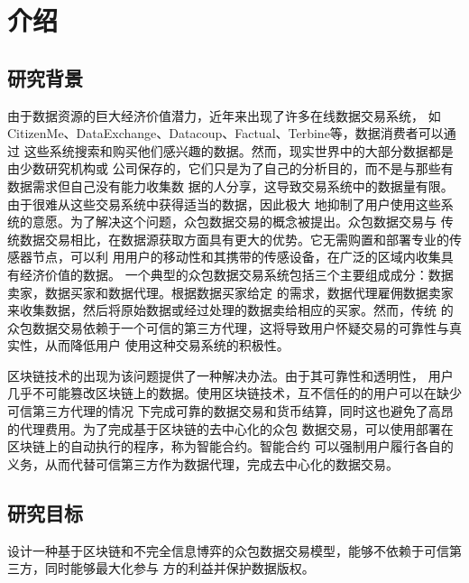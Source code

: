 \chapter{介绍}
\section{研究背景}
由于数据资源的巨大经济价值潜力，近年来出现了许多在线数据交易系统\cite{jung2017accounttrade}，
如CitizenMe、DataExchange、Datacoup、Factual、Terbine等，数据消费者可以通过
这些系统搜索和购买他们感兴趣的数据。然而，现实世界中的大部分数据都是由少数研究机构或
公司保存的，它们只是为了自己的分析目的，而不是与那些有数据需求但自己没有能力收集数
据的人分享，这导致交易系统中的数据量有限。由于很难从这些交易系统中获得适当的数据，因此极大
地抑制了用户使用这些系统的意愿。为了解决这个问题，众包数据交易的概念被提出。众包数据交易与
传统数据交易相比，在数据源获取方面具有更大的优势。它无需购置和部署专业的传感器节点，可以利
用用户的移动性和其携带的传感设备，在广泛的区域内收集具有经济价值的数据\cite{tong2020spatial,wang2017efficient,he2017exchange}。
一个典型的众包数据交易系统包括三个主要组成成分：数据卖家，数据买家和数据代理。根据数据买家给定
的需求，数据代理雇佣数据卖家来收集数据，然后将原始数据或经过处理的数据卖给相应的买家。然而，传统
的众包数据交易依赖于一个可信的第三方代理，这将导致用户怀疑交易的可靠性与真实性，从而降低用户
使用这种交易系统的积极性。

区块链技术的出现\cite{nakamoto2019bitcoin}为该问题提供了一种解决办法。由于其可靠性和透明性，
用户几乎不可能篡改区块链上的数据。使用区块链技术，互不信任的的用户可以在缺少可信第三方代理的情况
下完成可靠的数据交易和货币结算，同时这也避免了高昂的代理费用。为了完成基于区块链的去中心化的众包
数据交易，可以使用部署在区块链上的自动执行的程序，称为智能合约\cite{buterin2014next}。智能合约
可以强制用户履行各自的义务，从而代替可信第三方作为数据代理，完成去中心化的数据交易。
\section{研究目标}
设计一种基于区块链和不完全信息博弈的众包数据交易模型，能够不依赖于可信第三方，同时能够最大化参与
方的利益并保护数据版权。